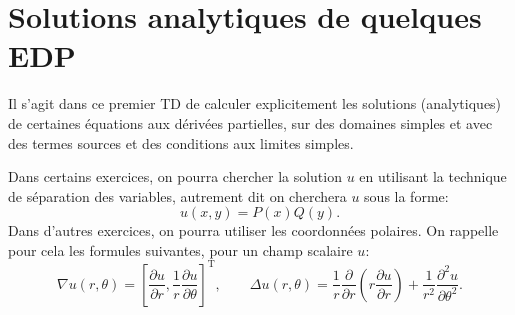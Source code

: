 


\newcommand{\eps}{\varepsilon}




\parindent0mm

\section{Solutions analytiques de quelques EDP}

Il s'agit dans ce premier TD de calculer explicitement les solutions (analytiques) de certaines équations aux dérivées partielles, sur des domaines simples et avec des termes sources et des conditions aux limites simples.

\medskip

Dans certains exercices, on pourra chercher la solution $u$ en utilisant la technique de séparation des variables, autrement dit on cherchera $u$ sous la forme:
\[
u(x,y) = P(x)Q(y).
\]
Dans d'autres exercices, on pourra utiliser les coordonn\'ees polaires. On rappelle pour cela les formules suivantes, pour un champ scalaire $u$:
\[
\nabla u (r,\theta) = \left [ \frac{\partial u}{\partial r} , \frac{1}{r}\frac{\partial u}{\partial \theta} \right ]^{\mathrm{T}}, \qquad
\Delta u (r,\theta) %
= \frac1{r} \frac{\partial}{\partial r} \left ( r \frac{\partial u}{\partial r} \right )
+ \frac1{r^2} \frac{\partial^2 u}{\partial \theta^2}.
\]

